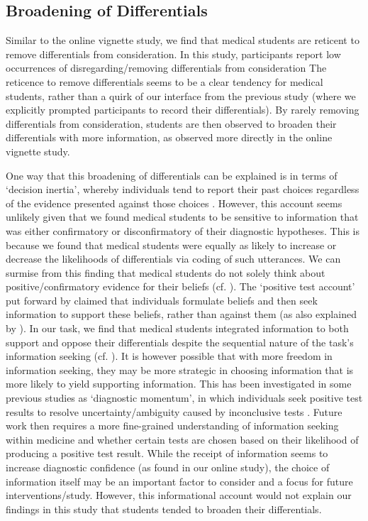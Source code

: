 \documentclass[a4paper, nobind]{templates/ociamthesis}
\begin{document}
\subsection{Broadening of Differentials}\label{broadening-of-differentials-1}

Similar to the online vignette study, we find that medical students are reticent to remove differentials from consideration. In this study, participants report low occurrences of disregarding/removing differentials from consideration The reticence to remove differentials seems to be a clear tendency for medical students, rather than a quirk of our interface from the previous study (where we explicitly prompted participants to record their differentials). By rarely removing differentials from consideration, students are then observed to broaden their differentials with more information, as observed more directly in the online vignette study.

One way that this broadening of differentials can be explained is in terms of `decision inertia', whereby individuals tend to report their past choices regardless of the evidence presented against those choices \autocite{akaishi_autonomous_2014}. However, this account seems unlikely given that we found medical students to be sensitive to information that was either confirmatory or disconfirmatory of their diagnostic hypotheses. This is because we found that medical students were equally as likely to increase or decrease the likelihoods of differentials via coding of such utterances. We can surmise from this finding that medical students do not solely think about positive/confirmatory evidence for their beliefs (cf. \textcite{kaanders_humans_2022}). The `positive test account' put forward by \autocite{klayman_confirmation_1987} claimed that individuals formulate beliefs and then seek information to support these beliefs, rather than against them (as also explained by \textcite{hunt_approach-induced_2016}). In our task, we find that medical students integrated information to both support and oppose their differentials despite the sequential nature of the task's information seeking (cf. \textcite{jonas_confirmation_2001}). It is however possible that with more freedom in information seeking, they may be more strategic in choosing information that is more likely to yield supporting information. This has been investigated in some previous studies as `diagnostic momentum', in which individuals seek positive test results to resolve uncertainty/ambiguity caused by inconclusive tests \autocite{aron_diagnostic_2024}. Future work then requires a more fine-grained understanding of information seeking within medicine and whether certain tests are chosen based on their likelihood of producing a positive test result. While the receipt of information seems to increase diagnostic confidence (as found in our online study), the choice of information itself may be an important factor to consider and a focus for future interventions/study. However, this informational account would not explain our findings in this study that students tended to broaden their differentials.
\end{document}
